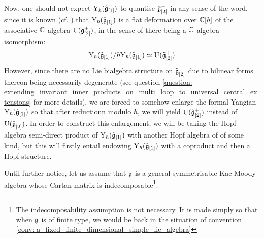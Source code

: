             Now, one should not expect $\mathrm{Y}_{\hbar}(\hat{\mathfrak{g}}_{[1]})$ to quantise $\hat{\mathfrak{g}}_{[2]}^+$ in any sense of the word, since it is known (cf. \cite{guay_nakajima_wendlandt_affine_yangian_vertex_representations_and_PBW}) that $\mathrm{Y}_{\hbar}(\hat{\mathfrak{g}}_{[1]})$ is a flat deformation over $\mathbb{C}[\hbar]$ of the associative $\mathbb{C}$-algebra $\mathrm{U}(\tilde{\mathfrak{g}}_{[2]}^+)$, in the sense of there being a $\mathbb{C}$-algebra isomorphism:
                $$\mathrm{Y}_{\hbar}(\hat{\mathfrak{g}}_{[1]})/\hbar \mathrm{Y}_{\hbar}(\hat{\mathfrak{g}}_{[1]}) \simeq \mathrm{U}(\tilde{\mathfrak{g}}_{[2]}^+)$$
            However, since there are no Lie bialgebra structure on $\tilde{\mathfrak{g}}_{[2]}^+$ due to bilinear forms thereon being necessarily degenerate (see question \ref{question: extending_invariant_inner_products_on_multi_loop_to_universal_central_extensions} for more details), we are forced to somehow enlarge the formal Yangian $\mathrm{Y}_{\hbar}(\hat{\mathfrak{g}}_{[1]})$ so that after reductionn modulo $\hbar$, we will yield $\mathrm{U}(\hat{\mathfrak{g}}_{[2]}^+)$ instead of $\mathrm{U}(\tilde{\mathfrak{g}}_{[2]}^+)$. In order to construct this enlargement, we will be taking the Hopf algebra semi-direct product of $\mathrm{Y}_{\hbar}(\hat{\mathfrak{g}}_{[1]})$ with another Hopf algebra of  of some kind, but this will firstly entail endowing $\mathrm{Y}_{\hbar}(\hat{\mathfrak{g}}_{[1]})$ with a coproduct and then a Hopf structure. 
        
            \begin{convention} \label{conv: general_symmetrisable_kac_moody_algebra}
                Until further notice, let us assume that $\mathfrak{g}$ is a general symmetrisable Kac-Moody algebra whose Cartan matrix is indecomposable\footnote{The indecomposability assumption is not necessary. It is made simply so that when $\mathfrak{g}$ is of finite type, we would be back in the situation of convention \ref{conv: a_fixed_finite_dimensional_simple_lie_algebra}}.
            \end{convention}

